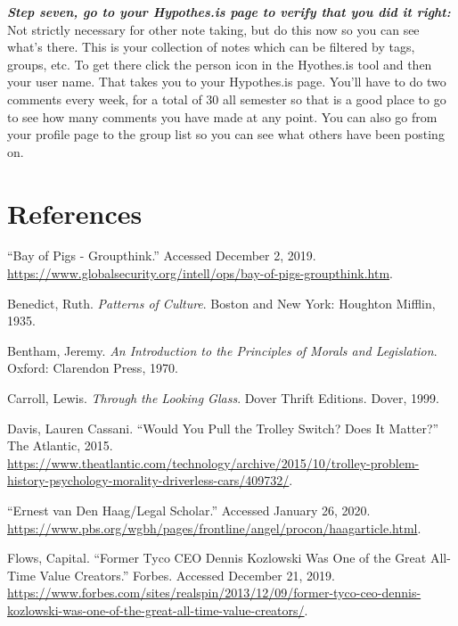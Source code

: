 \documentclass[
  12pt, openany]{book}
\begin{document}
\textbf{\emph{Step seven, go to your Hypothes.is page to verify that you did it right:}} Not strictly necessary for other note taking, but do this now so you can see what's there. This is your collection of notes which can be filtered by tags, groups, etc. To get there click the person icon in the Hyothes.is tool and then your user name. That takes you to your Hypothes.is page. You'll have to do two comments every week, for a total of 30 all semester so that is a good place to go to see how many comments you have made at any point. You can also go from your profile page to the group list so you can see what others have been posting on.

\hypertarget{references}{%
\chapter*{References}\label{references}}


\hypertarget{refs}{}
\leavevmode\hypertarget{ref-BayPigsGroupthink}{}%
``Bay of Pigs - Groupthink.'' Accessed December 2, 2019. \url{https://www.globalsecurity.org/intell/ops/bay-of-pigs-groupthink.htm}.

\leavevmode\hypertarget{ref-benedictPatternsCulture1935}{}%
Benedict, Ruth. \emph{Patterns of Culture}. Boston and New York: Houghton Mifflin, 1935.

\leavevmode\hypertarget{ref-benthamIntroductionPrinciplesMorals1970}{}%
Bentham, Jeremy. \emph{An Introduction to the Principles of Morals and Legislation}. Oxford: Clarendon Press, 1970.

\leavevmode\hypertarget{ref-carrollLookingGlass1999}{}%
Carroll, Lewis. \emph{Through the Looking Glass}. Dover Thrift Editions. Dover, 1999.

\leavevmode\hypertarget{ref-davisWouldYouPull2015}{}%
Davis, Lauren Cassani. ``Would You Pull the Trolley Switch? Does It Matter?'' The Atlantic, 2015. \url{https://www.theatlantic.com/technology/archive/2015/10/trolley-problem-history-psychology-morality-driverless-cars/409732/}.

\leavevmode\hypertarget{ref-ErnestVanHaag}{}%
``Ernest van Den Haag/Legal Scholar.'' Accessed January 26, 2020. \url{https://www.pbs.org/wgbh/pages/frontline/angel/procon/haagarticle.html}.

\leavevmode\hypertarget{ref-flowsFormerTycoCEO}{}%
Flows, Capital. ``Former Tyco CEO Dennis Kozlowski Was One of the Great All-Time Value Creators.'' Forbes. Accessed December 21, 2019. \url{https://www.forbes.com/sites/realspin/2013/12/09/former-tyco-ceo-dennis-kozlowski-was-one-of-the-great-all-time-value-creators/}.
\end{document}
